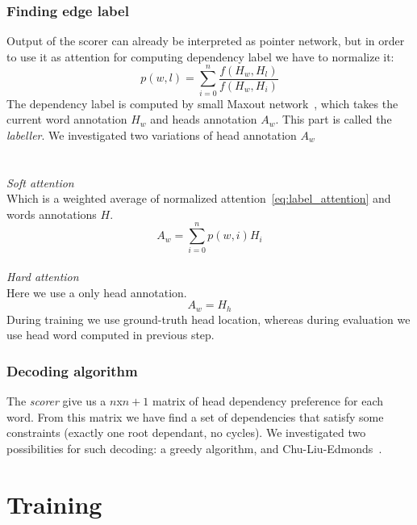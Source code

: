 \subsubsection{Finding edge label}
Output of the scorer can already be interpreted as
pointer network, but in order to use it as attention for computing dependency label
we have to normalize it:
\begin{equation} \label{eq:label_attention}
    p(w,l) = \sum_{i=0}^{n} \frac{f(H_w, H_l)}{f(H_w, H_i)}
\end{equation}
The dependency label is computed by small Maxout network~\cite{goodfellow_maxout_2013},
which takes the current word annotation $H_w$ and heads annotation $A_w$. This
part is called the \emph{labeller}.
We investigated two variations of head annotation $A_w$
\\
\\
\\
\emph{Soft attention}\\
Which is a weighted average of normalized attention~\ref{eq:label_attention}
and words annotations $H$. 
$$ A_w = \sum_{i=0}^{n} p(w,i)H_i $$
\\
\emph{Hard attention}\\
Here we use a only head annotation.
$$ A_w = H_h $$
During training we use ground-truth head location, whereas during evaluation
we use head word computed in previous step.

\subsubsection{Decoding algorithm}
The \emph{scorer} give us a $n$x$n+1$ matrix of head dependency preference
for each word. From this matrix we have find a set of dependencies that satisfy
some constraints (exactly one root dependant, no cycles).
We investigated two possibilities for such decoding: a greedy algorithm, and
Chu-Liu-Edmonds~\cite{edmonds_optimim_1966}.

\section{Training}
